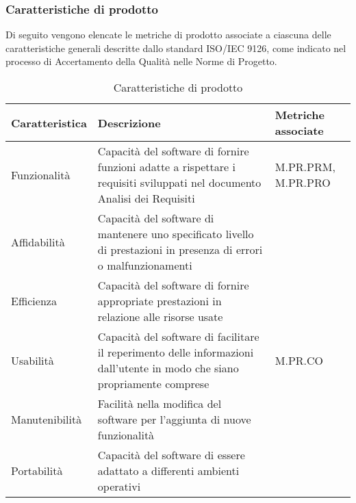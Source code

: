 \subsubsection{Caratteristiche di prodotto}
Di seguito vengono elencate le metriche di prodotto associate a ciascuna delle caratteristiche generali descritte dallo standard ISO/IEC 9126, 
come indicato nel processo di Accertamento della Qualità nelle Norme di Progetto.
\begin{table}[H]
    \centering
    \begin{tabularx}{\textwidth}{| X | X | X |}
    \hline
        \textbf{Caratteristica} & 
        \textbf{Descrizione} &
        \textbf{Metriche associate}\\
    \hline
        Funzionalità & Capacità del software di fornire funzioni adatte a rispettare i requisiti sviluppati nel documento Analisi dei Requisiti & M.PR.PRM, M.PR.PRO \\
    \hline
        Affidabilità & Capacità del software di mantenere uno specificato livello di prestazioni in presenza di errori o malfunzionamenti & \\
    \hline
        Efficienza & Capacità del software di fornire appropriate prestazioni in relazione alle risorse usate & \\
    \hline
        Usabilità & Capacità del software di facilitare il reperimento delle informazioni dall'utente in modo che siano propriamente comprese & M.PR.CO \\
    \hline
        Manutenibilità & Facilità nella modifica del software per l'aggiunta di nuove funzionalità & \\
    \hline
        Portabilità & Capacità del software di essere adattato a differenti ambienti operativi & \\
    \hline
    \end{tabularx}
    \caption{Caratteristiche di prodotto}
    \label{tab:caratteristiche_prodotto} 
\end{table}





